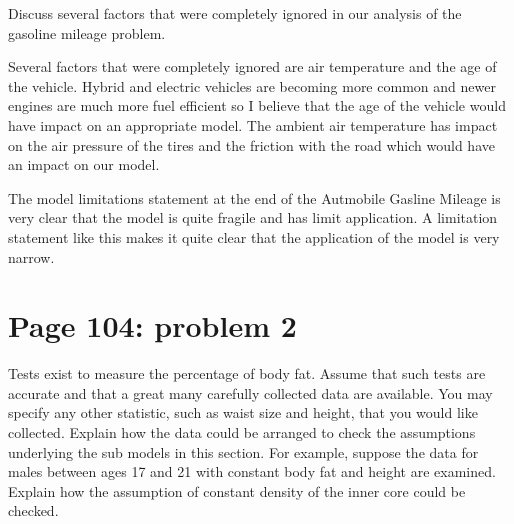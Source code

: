 \documentclass[]{article}
\begin{document}
Discuss several factors that were completely ignored in our analysis of
the gasoline mileage problem.

Several factors that were completely ignored are air temperature and the
age of the vehicle. Hybrid and electric vehicles are becoming more
common and newer engines are much more fuel efficient so I believe that
the age of the vehicle would have impact on an appropriate model. The
ambient air temperature has impact on the air pressure of the tires and
the friction with the road which would have an impact on our model.

The model limitations statement at the end of the Autmobile Gasline
Mileage is very clear that the model is quite fragile and has limit
application. A limitation statement like this makes it quite clear that
the application of the model is very narrow.

\section{Page 104: problem 2}\label{page-104-problem-2}

Tests exist to measure the percentage of body fat. Assume that such
tests are accurate and that a great many carefully collected data are
available. You may specify any other statistic, such as waist size and
height, that you would like collected. Explain how the data could be
arranged to check the assumptions underlying the sub models in this
section. For example, suppose the data for males between ages 17 and 21
with constant body fat and height are examined. Explain how the
assumption of constant density of the inner core could be checked.
\end{document}
